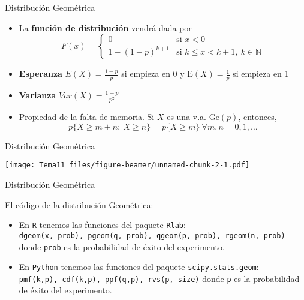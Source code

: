 \documentclass[
  ignorenonframetext,
]{beamer}
\providecommand{\tightlist}{%
  \setlength{\itemsep}{0pt}\setlength{\parskip}{0pt}}
\begin{document}
\begin{frame}{Distribución Geométrica}
\protect\hypertarget{distribuciuxf3n-geomuxe9trica-1}{}

\begin{itemize}
\tightlist
\item
  La \textbf{función de distribución} vendrá dada por \[F(x) = \left\{
  \begin{array}{cl}
     0 & \text{si } x<0 
  \\ 1-(1-p)^{k+1} & \text{si } k\le x<k+1,\ k\in\mathbb{N}
  \end{array}
  \right.\]
\item
  \textbf{Esperanza} \(E(X) = \frac{1-p}{p}\) si empieza en 0 y
  E\((X) = \frac{1}{p}\) si empieza en 1
\item
  \textbf{Varianza} \(Var(X) = \frac{1-p}{p^2}\)
\item
  Propiedad de la falta de memoria. Si \(X\) es una v.a.
  \(\text{Ge}(p)\), entonces,
  \[p\{X\ge m+n:\ X\ge n\} = p\{X\ge m\}\ \forall m,n=0,1,\dots\]
\end{itemize}

\end{frame}

\begin{frame}{Distribución Geométrica}
\protect\hypertarget{distribuciuxf3n-geomuxe9trica-2}{}

\texttt{[image: Tema11\_files/figure-beamer/unnamed-chunk-2-1.pdf]}

\end{frame}

\begin{frame}[fragile]{Distribución Geométrica}
\protect\hypertarget{distribuciuxf3n-geomuxe9trica-3}{}

El código de la distribución Geométrica:

\begin{itemize}
\tightlist
\item
  En \texttt{R} tenemos las funciones del paquete \texttt{Rlab}:
  \texttt{dgeom(x,\ prob),\ pgeom(q,\ prob),\ qgeom(p,\ prob),\ rgeom(n,\ prob)}
  donde \texttt{prob} es la probabilidad de éxito del experimento.
\item
  En \texttt{Python} tenemos las funciones del paquete
  \texttt{scipy.stats.geom}:
  \texttt{pmf(k,p),\ cdf(k,p),\ ppf(q,p),\ rvs(p,\ size)} donde
  \texttt{p} es la probabilidad de éxito del experimento.
\end{itemize}

\end{frame}
\end{document}
